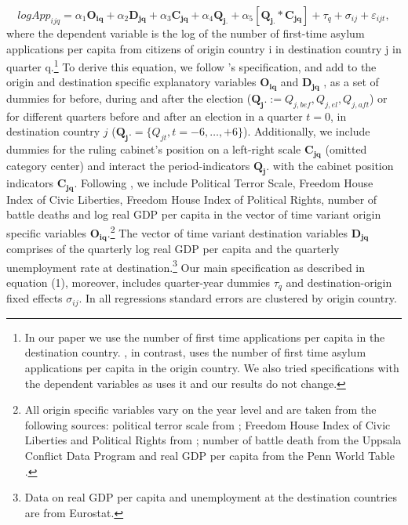 \documentclass[a4paper,12pt]{article}
\begin{document}
\begin{equation}
logApp_{ijq} =\alpha_1 \mathbf{O_{iq}} + \alpha_2 \mathbf{D_{jq}} + \alpha_3  \mathbf{C_{jq}} + \alpha_4\mathbf{Q_{j.}} + \alpha_5  [\mathbf{Q_{j.}} *  \mathbf{C_{jq}}] + \tau_q + \sigma_{ij} +  \varepsilon_{ijt},
\end{equation}where the dependent variable is the log of the number of first-time asylum applications per capita from citizens of origin country i in destination country j in quarter q.\footnote{In our paper we use the number of first time applications per capita in the destination country. \cite{hatton2016}, in contrast, uses the number of first time asylum applications per capita in the origin country. We also tried specifications with the dependent variables as \cite{hatton2016} uses it and our results do not change.} To derive this equation, we follow \cite{hatton2016}'s specification, and add to the origin and destination specific explanatory variables $\mathbf{O_{iq}}$ and $\mathbf{D_{jq}}$ , as a set of dummies for before, during and after the election ($\mathbf{Q_j.} := Q_{j,bef}, Q_{j,el}, Q_{j,aft}$) or for different quarters before and after an election in a quarter $t=0$, in destination country $j$ ($\mathbf{Q_j.} =\{Q_{jt}, t = -6, \ldots, +6\}$).  Additionally,  we include dummies for the ruling cabinet's position on a left-right scale $\mathbf{C_{jq}}$ (omitted category center)  and  interact the period-indicators $\mathbf{Q_j.}$ with the cabinet position indicators $\mathbf{C_{jq}}$.  Following \cite{hatton2016}, we include Political Terror Scale, Freedom House Index of Civic Liberties, Freedom House Index of  Political Rights, number of battle deaths and log real GDP per capita in the vector of time variant origin specific variables $\mathbf{O_{iq}}$.\footnote{All origin specific variables vary on the year level and are taken from the following sources: political terror scale from \cite{PTS2016};  Freedom House Index of Civic Liberties and Political Rights from \cite{FHI2017};  number of battle death  from the Uppsala Conflict Data Program \citep{Uppsala2017}  and real GDP per capita from the Penn World Table \citep{PWT2015}.} The vector of time variant destination variables $\mathbf{D_{jq}}$ comprises of the quarterly log real GDP per capita and the quarterly unemployment rate at destination.\footnote{Data on real GDP per capita and unemployment at the destination countries are from Eurostat.} Our main specification as described in equation (1), moreover, includes quarter-year dummies $\tau_q$ and destination-origin fixed effects $\sigma_{ij}$. In all regressions standard errors are clustered by origin country.
\end{document}
